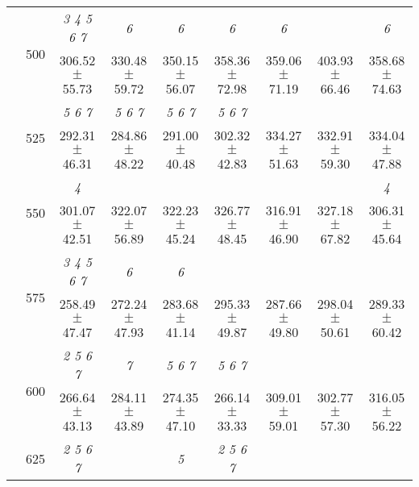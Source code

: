 \begin{table}[h]
{\begin{tabular}{
        ccccccccc}
 & \multirow{2}{*}{500}& \textit{ 3 4 5 6 7 }& \textit{ 6 }& \textit{ 6 }& \textit{ 6 }& \textit{ 6 }& & \textit{ 6 } \\ 
 & & 306.52 $\pm$ 55.73& 330.48 $\pm$ 59.72& 350.15 $\pm$ 56.07& 358.36 $\pm$ 72.98& 359.06 $\pm$ 71.19& 403.93 $\pm$ 66.46& 358.68 $\pm$ 74.63 \\ 
 & \multirow{2}{*}{525}& \cellcolor[HTML]{EFEFEF} \textit{ 5 6 7 }& \cellcolor[HTML]{EFEFEF} \textit{ 5 6 7 }& \cellcolor[HTML]{EFEFEF} \textit{ 5 6 7 }& \cellcolor[HTML]{EFEFEF} \textit{ 5 6 7 }& \cellcolor[HTML]{EFEFEF} & \cellcolor[HTML]{EFEFEF} & \cellcolor[HTML]{EFEFEF}  \\ 
 & & \cellcolor[HTML]{EFEFEF} 292.31 $\pm$ 46.31& \cellcolor[HTML]{EFEFEF} 284.86 $\pm$ 48.22& \cellcolor[HTML]{EFEFEF} 291.00 $\pm$ 40.48& \cellcolor[HTML]{EFEFEF} 302.32 $\pm$ 42.83& \cellcolor[HTML]{EFEFEF} 334.27 $\pm$ 51.63& \cellcolor[HTML]{EFEFEF} 332.91 $\pm$ 59.30& \cellcolor[HTML]{EFEFEF} 334.04 $\pm$ 47.88 \\ 
 & \multirow{2}{*}{550}& \textit{ 4 }& & & & & & \textit{ 4 } \\ 
 & & 301.07 $\pm$ 42.51& 322.07 $\pm$ 56.89& 322.23 $\pm$ 45.24& 326.77 $\pm$ 48.45& 316.91 $\pm$ 46.90& 327.18 $\pm$ 67.82& 306.31 $\pm$ 45.64 \\ 
 & \multirow{2}{*}{575}& \cellcolor[HTML]{EFEFEF} \textit{ 3 4 5 6 7 }& \cellcolor[HTML]{EFEFEF} \textit{ 6 }& \cellcolor[HTML]{EFEFEF} \textit{ 6 }& \cellcolor[HTML]{EFEFEF} & \cellcolor[HTML]{EFEFEF} & \cellcolor[HTML]{EFEFEF} & \cellcolor[HTML]{EFEFEF}  \\ 
 & & \cellcolor[HTML]{EFEFEF} 258.49 $\pm$ 47.47& \cellcolor[HTML]{EFEFEF} 272.24 $\pm$ 47.93& \cellcolor[HTML]{EFEFEF} 283.68 $\pm$ 41.14& \cellcolor[HTML]{EFEFEF} 295.33 $\pm$ 49.87& \cellcolor[HTML]{EFEFEF} 287.66 $\pm$ 49.80& \cellcolor[HTML]{EFEFEF} 298.04 $\pm$ 50.61& \cellcolor[HTML]{EFEFEF} 289.33 $\pm$ 60.42 \\ 
 & \multirow{2}{*}{600}& \textit{ 2 5 6 7 }& \textit{ 7 }& \textit{ 5 6 7 }& \textit{ 5 6 7 }& & &  \\ 
 & & 266.64 $\pm$ 43.13& 284.11 $\pm$ 43.89& 274.35 $\pm$ 47.10& 266.14 $\pm$ 33.33& 309.01 $\pm$ 59.01& 302.77 $\pm$ 57.30& 316.05 $\pm$ 56.22 \\ 
 & \multirow{2}{*}{625}& \cellcolor[HTML]{EFEFEF} \textit{ 2 5 6 7 }& \cellcolor[HTML]{EFEFEF} & \cellcolor[HTML]{EFEFEF} \textit{ 5 }& \cellcolor[HTML]{EFEFEF} \textit{ 2 5 6 7 }& \cellcolor[HTML]{EFEFEF} & \cellcolor[HTML]{EFEFEF} & \cellcolor[HTML]{EFEFEF}  \\ 

\end{tabular}}
\end{table}
